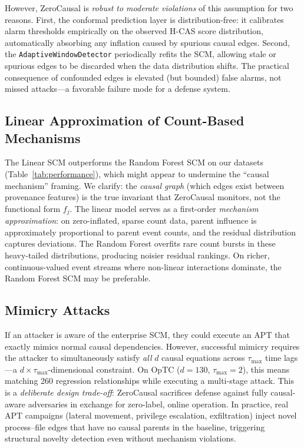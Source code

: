 However, ZeroCausal is \textit{robust to moderate violations} of this assumption for two reasons. First, the conformal prediction layer is distribution-free: it calibrates alarm thresholds empirically on the observed H-CAS score distribution, automatically absorbing any inflation caused by spurious causal edges. Second, the \texttt{AdaptiveWindowDetector} periodically refits the SCM, allowing stale or spurious edges to be discarded when the data distribution shifts. The practical consequence of confounded edges is elevated (but bounded) false alarms, not missed attacks---a favorable failure mode for a defense system.

\subsection{Linear Approximation of Count-Based Mechanisms}
The Linear SCM outperforms the Random Forest SCM on our datasets (Table~\ref{tab:performance}), which might appear to undermine the ``causal mechanism'' framing. We clarify: the \textit{causal graph} (which edges exist between provenance features) is the true invariant that ZeroCausal monitors, not the functional form $f_j$. The linear model serves as a first-order \textit{mechanism approximation}: on zero-inflated, sparse count data, parent influence is approximately proportional to parent event counts, and the residual distribution captures deviations. The Random Forest overfits rare count bursts in these heavy-tailed distributions, producing noisier residual rankings. On richer, continuous-valued event streams where non-linear interactions dominate, the Random Forest SCM may be preferable.

\subsection{Mimicry Attacks}
If an attacker is aware of the enterprise SCM, they could execute an APT that exactly mimics normal causal dependencies. However, successful mimicry requires the attacker to simultaneously satisfy \textit{all} $d$ causal equations across $\tau_{\max}$ time lags---a $d \times \tau_{\max}$-dimensional constraint. On OpTC ($d = 130$, $\tau_{\max} = 2$), this means matching 260 regression relationships while executing a multi-stage attack. This is a \textit{deliberate design trade-off}: ZeroCausal sacrifices defense against fully causal-aware adversaries in exchange for zero-label, online operation. In practice, real APT campaigns (lateral movement, privilege escalation, exfiltration) inject novel process--file edges that have no causal parents in the baseline, triggering structural novelty detection even without mechanism violations.

